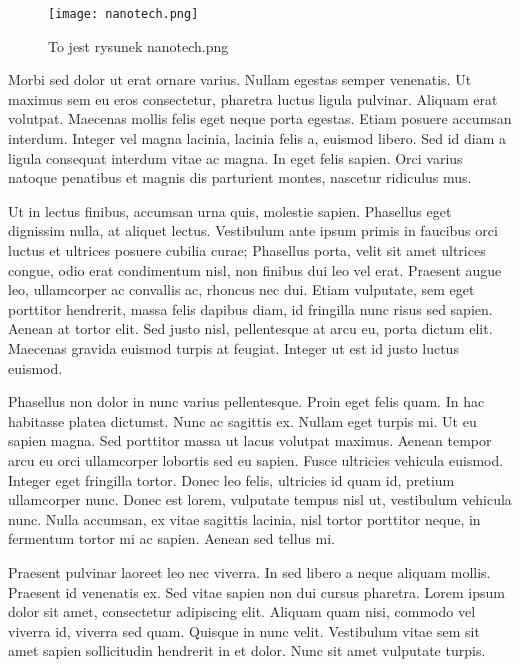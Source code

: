 \documentclass[12pt]{article}
\begin{document}
\begin{figure}[t]
    \centering
    
    \texttt{[image: nanotech.png]}
    \caption{To jest rysunek nanotech.png}
    \label{fig:nanotech}
\end{figure}

Morbi sed dolor ut erat ornare varius. Nullam egestas semper venenatis. Ut maximus sem eu eros consectetur, pharetra luctus ligula pulvinar. Aliquam erat volutpat. Maecenas mollis felis eget neque porta egestas. Etiam posuere accumsan interdum. Integer vel magna lacinia, lacinia felis a, euismod libero. Sed id diam a ligula consequat interdum vitae ac magna. In eget felis sapien. Orci varius natoque penatibus et magnis dis parturient montes, nascetur ridiculus mus.

Ut in lectus finibus, accumsan urna quis, molestie sapien. Phasellus eget dignissim nulla, at aliquet lectus. Vestibulum ante ipsum primis in faucibus orci luctus et ultrices posuere cubilia curae; Phasellus porta, velit sit amet ultrices congue, odio erat condimentum nisl, non finibus dui leo vel erat. Praesent augue leo, ullamcorper ac convallis ac, rhoncus nec dui. Etiam vulputate, sem eget porttitor hendrerit, massa felis dapibus diam, id fringilla nunc risus sed sapien. Aenean at tortor elit. Sed justo nisl, pellentesque at arcu eu, porta dictum elit. Maecenas gravida euismod turpis at feugiat. Integer ut est id justo luctus euismod.

Phasellus non dolor in nunc varius pellentesque. Proin eget felis quam. In hac habitasse platea dictumst. Nunc ac sagittis ex. Nullam eget turpis mi. Ut eu sapien magna. Sed porttitor massa ut lacus volutpat maximus. Aenean tempor arcu eu orci ullamcorper lobortis sed eu sapien. Fusce ultricies vehicula euismod. Integer eget fringilla tortor. Donec leo felis, ultricies id quam id, pretium ullamcorper nunc. Donec est lorem, vulputate tempus nisl ut, vestibulum vehicula nunc. Nulla accumsan, ex vitae sagittis lacinia, nisl tortor porttitor neque, in fermentum tortor mi ac sapien. Aenean sed tellus mi.

Praesent pulvinar laoreet leo nec viverra. In sed libero a neque aliquam mollis. Praesent id venenatis ex. Sed vitae sapien non dui cursus pharetra. Lorem ipsum dolor sit amet, consectetur adipiscing elit. Aliquam quam nisi, commodo vel viverra id, viverra sed quam. Quisque in nunc velit. Vestibulum vitae sem sit amet sapien sollicitudin hendrerit in et dolor. Nunc sit amet vulputate turpis.
\end{document}
